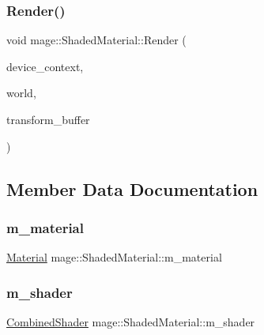 \hypertarget{structmage_1_1_shaded_material_a64cdb2b88a2cccbc25e35552fa0ff532}{}\label{structmage_1_1_shaded_material_a64cdb2b88a2cccbc25e35552fa0ff532} 
\subsubsection{\texorpdfstring{Render()}{Render()}}
{\footnotesize\ttfamily void mage\+::\+Shaded\+Material\+::\+Render (\begin{DoxyParamCaption}\item[{\hyperlink{namespacemage_ae74f374780900893caa5555d1031fd79}{Com\+Ptr}$<$ I\+D3\+D11\+Device\+Context2 $>$}]{device\+\_\+context,  }\item[{const \hyperlink{classmage_1_1_world}{World} \&}]{world,  }\item[{const \hyperlink{structmage_1_1_transform_buffer}{Transform\+Buffer} \&}]{transform\+\_\+buffer }\end{DoxyParamCaption})}



\subsection{Member Data Documentation}
\hypertarget{structmage_1_1_shaded_material_a319e1ca2103c50f84ce0605b08bd34b4}{}\label{structmage_1_1_shaded_material_a319e1ca2103c50f84ce0605b08bd34b4} 
\subsubsection{\texorpdfstring{m\+\_\+material}{m\_material}}
{\footnotesize\ttfamily \hyperlink{structmage_1_1_material}{Material} mage\+::\+Shaded\+Material\+::m\+\_\+material\hspace{0.3cm}{\ttfamily [private]}}

\hypertarget{structmage_1_1_shaded_material_a712d07ac1995ff592bbb8ab20a294270}{}\label{structmage_1_1_shaded_material_a712d07ac1995ff592bbb8ab20a294270} 
\subsubsection{\texorpdfstring{m\+\_\+shader}{m\_shader}}
{\footnotesize\ttfamily \hyperlink{structmage_1_1_combined_shader}{Combined\+Shader} mage\+::\+Shaded\+Material\+::m\+\_\+shader\hspace{0.3cm}{\ttfamily [private]}}

